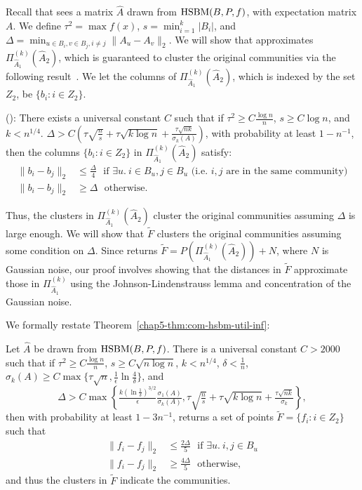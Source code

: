Recall that \dpcom{} sees a matrix $\hat{A}$ drawn from $\textnormal{HSBM}(B,P,f)$, with expectation matrix $A$. We define $\tau^2 = \max f(x)$, $s = \min_{i=1}^k |B_i|$, and $\Delta=\min_{u \in B_i, v \in B_j, i \neq j} \|A_u - A_v\|_2$. 
We will show that \dpcom{} approximates $\Pi_{\hat{A}_1}^{(k)}(\hat{A}_2)$, which is guaranteed to cluster the original communities via the following result~\citep{vu2014simple}. We let the columns of $\Pi_{\hat{A}_1}^{(k)}(\hat{A}_2)$, which is indexed by the set $Z_2$, be $\{b_i : i \in Z_2\}$.

\begin{thm}\label{chap5-thm:svd-recovery} (\citet{vu2014simple}): There exists a universal constant $C$ such that if $\tau^2 \geq C \frac{\log n}{n}$, $s \geq C \log n$, and $k < n^{1/4}$.  $\Delta > C (\tau \sqrt{\frac{n}{s}} + \tau \sqrt{k \log n} + \frac{\tau\sqrt{nk}}{\sigma_k(A)})$, with probability at least $1 - n^{-1}$, then the columns $\{b_i : i \in Z_2\}$ in $\Pi_{\hat{A}_1}^{(k)}(\hat{A}_2)$ satisfy:
\begin{align*}
    \|b_{i} - b_{j}\|_2 &\leq \frac{\Delta}{4}  \ \ \ \text{if $\exists u.~i \in B_u, j \in B_u$ (i.e. $i,j$ are in the same community)} \\ 
    \|b_{i} - b_{j}\|_2 &\geq \Delta  \ \ \ \text{otherwise.}
\end{align*}
\end{thm}

Thus, the clusters in $\Pi_{\hat{A}_1}^{(k)}(\hat{A}_2)$ cluster the original communities assuming $\Delta$ is large enough. We will show that $\tilde{F}$ clusters the original communities assuming some condition on $\Delta$. Since
\dpcom{} returns $\tilde{F} = P(\Pi_{\hat{A}_1}^{(k)}(\hat{A}_2)) + N$, where $N$ is Gaussian noise, our proof involves showing that the distances in $\tilde{F}$ approximate those in $\Pi_{\hat{A}_1}^{(k)}$ using the Johnson-Lindenstrauss lemma and concentration of the Gaussian noise.

We formally restate Theorem~\ref{chap5-thm:com-hsbm-util-inf}:

\begin{thm}\label{chap5-thm:com-hsbm-util}
Let $\hat{A}$ be drawn from $\textnormal{HSBM}(B,P,f)$. There is a universal constant $C > 2000$ such that if $\tau^2 \geq C \frac{\log n}{n}$, $s \geq C \sqrt{n \log n}$, $k < n^{1/4}$, $\delta < \frac{1}{n}$, $\sigma_k(A) \geq C \max\{ \tau \sqrt{n}, \frac{1}{\epsilon} \ln \frac{4}{\delta}\}$, and 
\[\Delta > C\max\left\{\tfrac{ k (\ln \frac{1}{\delta})^{3/2}}\epsilon \tfrac{\sigma_1(A)}{\sigma_{k}(A)},  \tau \sqrt{\tfrac{n}{s}} + \tau \sqrt{k \log n} + \tfrac{\tau\sqrt{nk}}{\sigma_k}\right\},\]
then with probability at least $1 - 3n^{-1}$, \dpcom{} returns a set of points $\tilde{F} = \{f_i : i \in Z_2\}$ such that
\begin{align*}
    \|f_{i} - f_{j}\|_2 &\leq \frac{2\Delta}{5}  \ \ \ \text{if $\exists u.~i,j \in B_u$} \\
    \|f_{i} - f_{j}\|_2 &\geq \frac{4\Delta}{5}  \ \ \ \text{otherwise},
\end{align*}
and thus the clusters in $\tilde{F}$ indicate the communities.
\end{thm}

